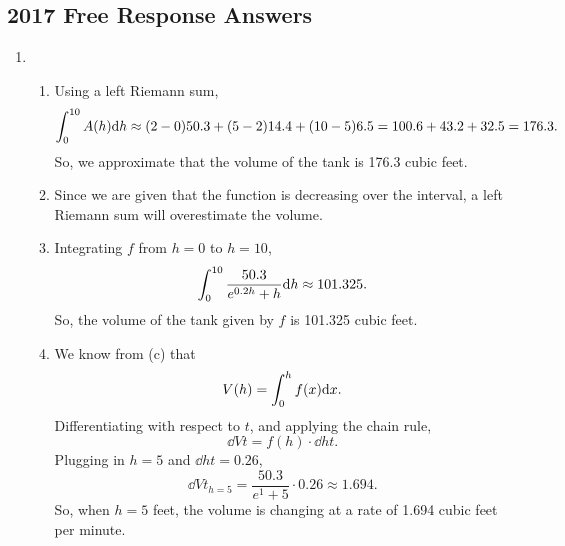 \subsection{2017 Free Response Answers}

\begin{enumerate}
	\item \begin{enumerate}
		\item Using a left Riemann sum,
			\begin{equation*}
				\int_{0}^{10}{A(h)\mathrm{d} h} \approx (2-0)50.3 + (5-2)14.4 + (10-5)6.5 = 100.6 + 43.2 + 32.5 = 176.3.
 			\end{equation*}
 			So, we approximate that the volume of the tank is 176.3 cubic feet.
 		\item Since we are given that the function is decreasing over the interval, a left Riemann sum will overestimate the volume.
 		\item Integrating $f$ from $h=0$ to $h=10$,
 			\begin{equation*}
 				\int_{0}^{10}{\frac{50.3}{e^{0.2h}+h}\mathrm{d} h} \approx 101.325.
 			\end{equation*}
 			So, the volume of the tank given by $f$ is 101.325 cubic feet.
 		\item We know from (c) that
 			\begin{equation*}
 				V(h) = \int_{0}^{h}{f(x)\mathrm{d} x}.
 			\end{equation*}
 			Differentiating with respect to $t$, and applying the chain rule,
 			\begin{equation*}
 				\dd{V}{t} = f(h)\cdot\dd{h}{t}.
 			\end{equation*}
 			Plugging in $h=5$ and $\dd{h}{t}=0.26$,
 			\begin{equation*}
 				\dd{V}{t}_{h=5} = \frac{50.3}{e^1 + 5}\cdot 0.26 \approx 1.694.
 			\end{equation*}
 			So, when $h=5$ feet, the volume is changing at a rate of 1.694 cubic feet per minute.
	\end{enumerate}


\end{enumerate}
